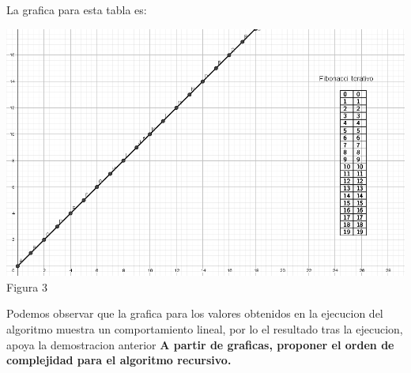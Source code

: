 \documentclass[spanish]{article}
\begin{document}
	\newpage
	La grafica para esta tabla es:\\
	\begin{center}
		\includegraphics{./imagenes/fibo1.png}\\
		Figura 3\\
	\end{center}
	Podemos observar que la grafica para los valores obtenidos en la ejecucion del algoritmo muestra un comportamiento lineal, por lo 	el resultado tras la ejecucion, apoya la demostracion anterior
\newpage
	{\large{\bf A partir de graficas, proponer el orden de complejidad para el algoritmo recursivo.}}\\
\end{document}
